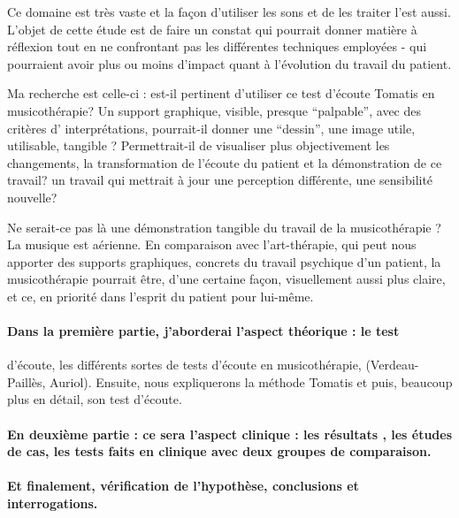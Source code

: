 Ce domaine est très vaste et la façon d'utiliser les sons et de les
traiter l'est aussi. L'objet de cette étude est de faire un constat
qui pourrait donner matière à réflexion tout en ne confrontant pas
les différentes techniques employées - qui pourraient avoir plus ou
moins d'impact quant à l'évolution du travail du patient.

Ma recherche est celle-ci : est-il pertinent d'utiliser ce test d'écoute
Tomatis en musicothérapie? Un support graphique, visible, presque
``palpable'', avec des critères d' interprétations, pourrait-il
donner une ``dessin'', une image utile, utilisable, tangible ? Permettrait-il
de visualiser plus objectivement les changements, la transformation
de l'écoute du patient et la démonstration de ce travail? un travail
qui mettrait à jour une perception différente, une sensibilité nouvelle?

Ne serait-ce pas là une démonstration tangible du travail de la musicothérapie
? La musique est aérienne. En comparaison avec l'art-thérapie, qui
peut nous apporter des supports graphiques, concrets du travail psychique
d'un patient, la musicothérapie pourrait être, d'une certaine façon,
visuellement aussi plus claire, et ce, en priorité dans l'esprit du
patient pour lui-même. 

 
 

\paragraph{Dans la première partie, j'aborderai l'aspect théorique : le test}
d'écoute, les différents sortes de tests d'écoute en musicothérapie, (Verdeau-Paillès, Auriol). Ensuite, nous expliquerons la méthode Tomatis
et puis, beaucoup plus en détail, son test d'écoute.

\paragraph{En deuxième partie : ce sera l'aspect clinique : les résultats ,
les études de cas, les tests faits en clinique avec deux groupes de
comparaison.}

\paragraph{Et finalement, vérification de l'hypothèse, conclusions et interrogations.}
